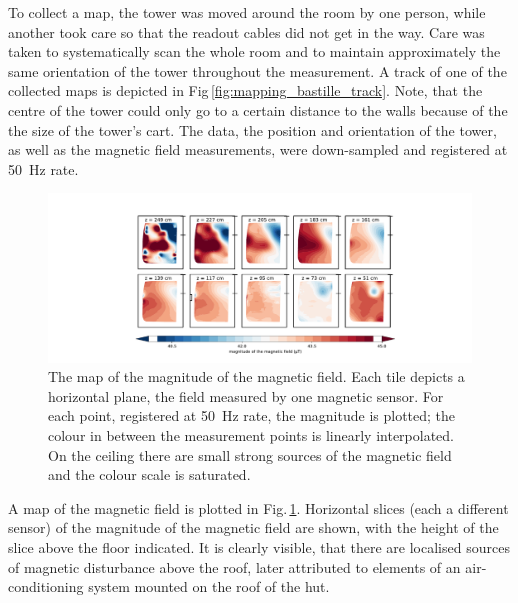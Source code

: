 To collect a map, the tower was moved around the room by one person, while another took care so that the readout cables did not get in the way.
Care was taken to systematically scan the whole room and to maintain approximately the same orientation of the tower throughout the measurement. A track of one of the collected maps is depicted in Fig\,\ref{fig:mapping_bastille_track}. Note, that the centre of the tower could only go to a certain distance to the walls because of the the size of the tower's cart.
The data, the position and orientation of the tower, as well as the magnetic field measurements, were down-sampled and registered at \SI{50}{\hertz} rate.

\begin{figure}
  \centering
  \includegraphics[width=\linewidth]{gfx/mapping/lpsc/bastille_crane_away_rep_magnitude_low_range_crop.pdf}
  \caption{The map of the magnitude of the magnetic field. Each tile depicts a horizontal plane, the field measured by one magnetic sensor. For each point, registered at \SI{50}{\hertz} rate, the magnitude is plotted; the colour in between the measurement points is linearly interpolated. On the ceiling there are small strong sources of the magnetic field and the colour scale is saturated.}\label{fig:mapping_bastille_magnitude}
\end{figure}

A map of the magnetic field is plotted in Fig.\,\ref{fig:mapping_bastille_magnitude}. Horizontal slices (each a different sensor) of the magnitude of the magnetic field are shown, with the height of the slice above the floor indicated. It is clearly visible, that there are localised sources of magnetic disturbance above the roof, later attributed to elements of an air-conditioning system mounted on the roof of the hut.

